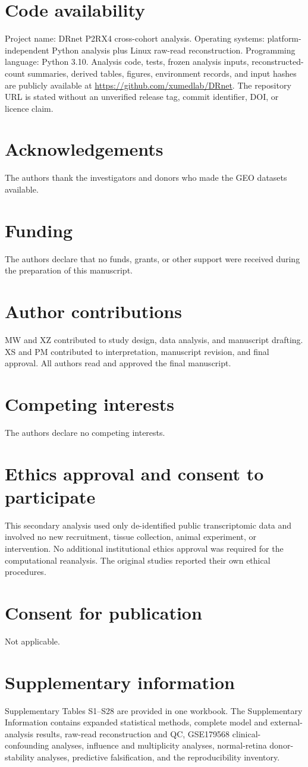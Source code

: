 \documentclass[12pt]{article}
\begin{document}
\section*{Code availability}
Project name: DRnet P2RX4 cross-cohort analysis. Operating systems: platform-independent Python analysis plus Linux raw-read reconstruction. Programming language: Python 3.10. Analysis code, tests, frozen analysis inputs, reconstructed-count summaries, derived tables, figures, environment records, and input hashes are publicly available at \url{https://github.com/xumedlab/DRnet}. The repository URL is stated without an unverified release tag, commit identifier, DOI, or licence claim.

\section*{Acknowledgements}
The authors thank the investigators and donors who made the GEO datasets available.
\section*{Funding}
The authors declare that no funds, grants, or other support were received during the preparation of this manuscript.
\section*{Author contributions}
MW and XZ contributed to study design, data analysis, and manuscript drafting. XS and PM contributed to interpretation, manuscript revision, and final approval. All authors read and approved the final manuscript.
\section*{Competing interests}
The authors declare no competing interests.
\section*{Ethics approval and consent to participate}
This secondary analysis used only de-identified public transcriptomic data and involved no new recruitment, tissue collection, animal experiment, or intervention. No additional institutional ethics approval was required for the computational reanalysis. The original studies reported their own ethical procedures.
\section*{Consent for publication}
Not applicable.
\section*{Supplementary information}
Supplementary Tables S1--S28 are provided in one workbook. The Supplementary Information contains expanded statistical methods, complete model and external-analysis results, raw-read reconstruction and QC, GSE179568 clinical-confounding analyses, influence and multiplicity analyses, normal-retina donor-stability analyses, predictive falsification, and the reproducibility inventory.



\end{document}

